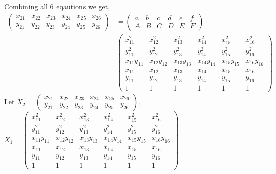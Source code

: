 \documentclass[12pt]{article}
\begin{document}
    Combining all 6 eqautions we get, 
    \begin{align}
        \label{final1}
        \begin{pmatrix}
            x_{21} & x_{22} & x_{23} & x_{24} & x_{25} & x_{26}\\
            y_{21} & y_{22} & y_{23} & y_{24} & y_{25} & y_{26}
        \end{pmatrix}
        &
        =
        \begin{pmatrix}
            a & b & c & d & e & f \\
            A & B & C & D & E & F
        \end{pmatrix}
        \cdot 
        \nonumber \\
        &\begin{pmatrix}
            x_{11}^{2} & x_{12}^{2} & x_{13}^{2} & x_{14}^{2} & x_{15}^{2} & x_{16}^{2} \\
            y_{11}^{2} & y_{12}^{2} & y_{13}^{2} & y_{14}^{2} & y_{15}^{2} & y_{16}^{2} \\
            x_{11}y_{11} & x_{12}y_{12} & x_{13}y_{13} & x_{14}y_{14} & x_{15}y_{15} & x_{16}y_{16} \\
            x_{11} & x_{12} & x_{13} & x_{14} & x_{15} & x_{16} \\
            y_{11} & y_{12} & y_{13} & y_{14} & y_{15} & y_{16} \\ 
            1 & 1 & 1 & 1 & 1 & 1 
        \end{pmatrix}        
    \end{align}
    Let $X_{2} = \begin{pmatrix}
        x_{21} & x_{22} & x_{23} & x_{24} & x_{25} & x_{26}\\
        y_{21} & y_{22} & y_{23} & y_{24} & y_{25} & y_{26}
    \end{pmatrix}$, $X_{1} = \begin{pmatrix}
        x_{11}^{2} & x_{12}^{2} & x_{13}^{2} & x_{14}^{2} & x_{15}^{2} & x_{16}^{2} \\
        y_{11}^{2} & y_{12}^{2} & y_{13}^{2} & y_{14}^{2} & y_{15}^{2} & y_{16}^{2} \\
        x_{11}y_{11} & x_{12}y_{12} & x_{13}y_{13} & x_{14}y_{14} & x_{15}y_{15} & x_{16}y_{16} \\
        x_{11} & x_{12} & x_{13} & x_{14} & x_{15} & x_{16} \\
        y_{11} & y_{12} & y_{13} & y_{14} & y_{15} & y_{16} \\ 
        1 & 1 & 1 & 1 & 1 & 1 
    \end{pmatrix}$
\end{document}
